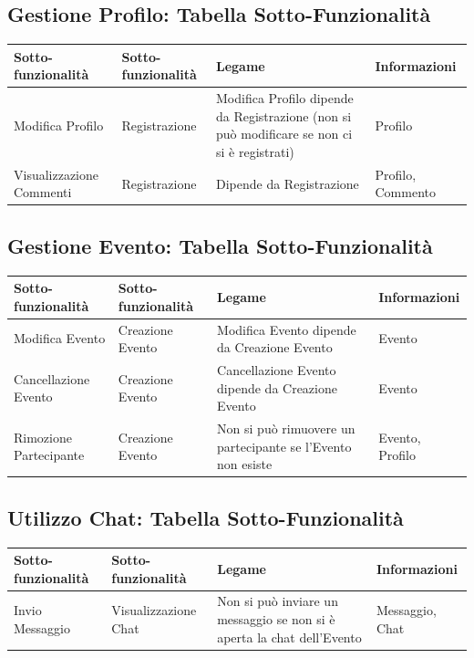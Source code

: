\documentclass[12pt,a4paper]{report}
\begin{document}
\subsection{Gestione Profilo: Tabella Sotto-Funzionalità}
\begin{tabularx}{\textwidth}{|p{3.2cm}|p{2.5cm}|X|p{2.4cm}|}
    \hline
    \rowcolor{studyColor} \textbf{Sotto-funzionalità} & \textbf{Sotto-funzionalità} & \textbf{Legame} & \textbf{Informazioni} \\ \hline
    \endhead
    Modifica Profilo & Registrazione & Modifica Profilo dipende da Registrazione (non si può modificare se non ci si è registrati) & Profilo \\ \hline
    Visualizzazione Commenti & Registrazione & Dipende da Registrazione & Profilo, Commento \\ \hline
\end{tabularx}

\subsection{Gestione Evento: Tabella Sotto-Funzionalità}
\begin{tabularx}{\textwidth}{|p{3.2cm}|p{2.5cm}|X|p{2.4cm}|}
    \hline
    \rowcolor{studyColor} \textbf{Sotto-funzionalità} & \textbf{Sotto-funzionalità} & \textbf{Legame} & \textbf{Informazioni} \\ \hline
    \endhead
    Modifica Evento & Creazione Evento & Modifica Evento dipende da Creazione Evento & Evento \\ \hline
    Cancellazione Evento & Creazione Evento & Cancellazione Evento dipende da Creazione Evento & Evento \\ \hline
    Rimozione Partecipante & Creazione Evento & Non si può rimuovere un partecipante se l'Evento non esiste & Evento, Profilo \\ \hline
\end{tabularx}

\subsection{Utilizzo Chat: Tabella Sotto-Funzionalità}
\begin{tabularx}{\textwidth}{|p{3.2cm}|p{2.5cm}|X|p{2.4cm}|}
    \hline
    \rowcolor{studyColor} \textbf{Sotto-funzionalità} & \textbf{Sotto-funzionalità} & \textbf{Legame} & \textbf{Informazioni} \\ \hline
    \endhead
    Invio Messaggio & Visualizzazione Chat & Non si può inviare un messaggio se non si è aperta la chat dell'Evento & Messaggio, Chat \\ \hline
\end{tabularx}
\end{document}
